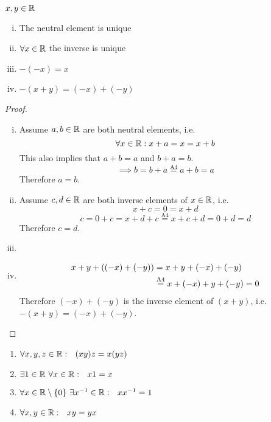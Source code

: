 \documentclass[../../script.tex]{subfiles}
\begin{document}
\begin{thm}\label{thm:addition}
$x, y \in \mathbb{R}$

\begin{enumerate}[(i)]
	\item The neutral element is unique
	\item $\forall x \in \mathbb{R}$ the inverse is unique
	\item $-(-x) = x$
	\item $-(x + y) = (-x) + (-y)$
\end{enumerate}
\end{thm}
\begin{proof}\leavevmode
	\begin{enumerate}[(i)]
		\item Assume $a, b \in \mathbb{R}$ are both neutral elements, i.e.
		\begin{equation}
			\forall x \in \mathbb{R}: x + a = x = x + b
		\end{equation}
		This also implies that $a + b = a$ and $b + a = b$.
		\begin{equation}
			\implies b = b + a \stackrel{\text{A4}}{=} a + b = a
		\end{equation}
		Therefore $a = b$.
		
		\item Assume $c, d \in \mathbb{R}$ are both inverse elements of $x \in \mathbb{R}$, i.e.
		\begin{equation}
			x + c = 0 = x + d
		\end{equation}
		\begin{equation}
			c = 0 + c = x + d + c \stackrel{\text{A4}}{=} x + c + d = 0 + d = d
		\end{equation}
		Therefore $c = d$.
		
		\item \reader
		
		\item
		\begin{equation}
		\begin{split}
			x + y + ((-x) + (-y)) &= x + y + (-x) + (-y) \\ 
			&\stackrel{\text{A4}}{=} x + (-x) + y + (-y) = 0
		\end{split}
		\end{equation}
		Therefore $(-x) + (-y)$ is the inverse element of $(x+y)$, i.e. $-(x + y) = (-x) + (-y)$.
	\end{enumerate}
\end{proof}

\begin{defi}\leavevmode
\begin{enumerate}[label=M\arabic*:]
	\item $\forall x, y, z \in \mathbb{R}: ~~(xy)z = x(yz)$
	\item $\exists 1 \in \mathbb{R} ~\forall x \in \mathbb{R}: ~~x1 = x$
	\item $\forall x \in \mathbb{R} \setminus \{0\} ~\exists {x}^{-1} \in \mathbb{R}: ~~x{x}^{-1} = 1$
	\item $\forall x, y \in \mathbb{R}: ~~xy = yx$
\end{enumerate}
\end{defi}
\end{document}
